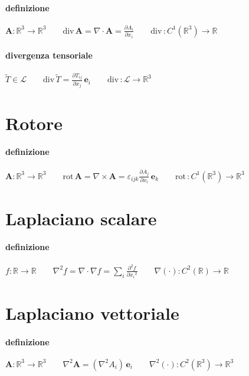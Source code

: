 \documentclass[10pt,a4paper]{article}
\newcommand{\fracp}[2]{\frac{\partial #1}{\partial #2}}
\newcommand{\dive}[1]{\text{div}\,#1}
\newcommand{\rot}[1]{\text{rot}\,#1}
\begin{document}
\paragraph{definizione}
$\mathbf A: \mathbb{R}^3 \longrightarrow \mathbb{R}^3 \qquad \dive{\mathbf A}= \nabla \cdot \mathbf A =\fracp{A_i}{x_i} \qquad\dive{}: C^1(\mathbb{R}^3) \longrightarrow \mathbb{R}$

\paragraph{divergenza tensoriale}
$\tilde T \in \mathscr L \qquad \dive{\tilde T} = \fracp{T_{ij}}{x_j}\, \mathbf e_i \qquad \dive{}: \mathscr L \longrightarrow \mathbb{R}^3$



	\section{Rotore}
\paragraph{definizione}
$\mathbf A: \mathbb{R}^3 \to \mathbb{R}^3 \qquad \rot{\mathbf A}= \nabla \times \mathbf A = \varepsilon_{ijk} \fracp{A_j}{x_i}\, \mathbf e_k \qquad\rot{}: C^1(\mathbb{R}^3) \longrightarrow \mathbb{R}^3$



	\section{Laplaciano scalare}
\paragraph{definizione}
$f: \mathbb{R} \longrightarrow \mathbb{R} \qquad \nabla^2 f = \nabla \cdot \nabla f = \sum_i\frac{\partial^2 f}{\partial {x_i}^2} \qquad \nabla(\cdot): C^2(\mathbb{R}) \longrightarrow \mathbb{R}$



	\section{Laplaciano vettoriale}
\paragraph{definizione}
$\mathbf A: \mathbb{R}^3 \longrightarrow \mathbb{R}^3 \qquad \nabla^2 \mathbf A = (\nabla^2 A_i)\, \mathbf e_i \qquad \nabla^2(\cdot): C^2(\mathbb{R}^3) \longrightarrow \mathbb{R}^3$
	
\end{document}
